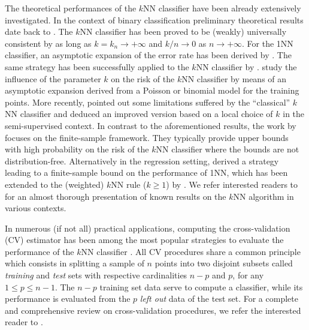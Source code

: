 \documentclass[twoside,11pt]{article}
\numberwithin{equation}{section}
\newcommand{\1}{\mathds{1}}%
\numberwithin{equation}{section}
\theoremstyle{plain}
\begin{document}
The theoretical performances of the $k$NN classifier have been already extensively investigated.
%
In the context of binary classification preliminary theoretical results date back to \cite{Cover_Hart:1967,Cover68,Gyorfi_1981}.
	The $k$NN classifier has been proved to be (weakly) universally consistent by \citet{Stone_1977} as long as $k=k_n \to +\infty$ and $k/n \to 0$ as $n\to +\infty$.
	For the 1NN classifier, an asymptotic expansion of the error rate has been derived by \citet{Psaltis_Snapp_Venkatesh:1994}. The same strategy has been successfully applied to the $k$NN classifier by \cite{Snapp_Venkatesh:1998}.
%
\cite{Hall_Park_Samworth:2008} study the influence of the parameter $k$ on the risk of the $k$NN classifier by means of an asymptotic expansion derived from a Poisson or binomial model for the training points.
%
 {More recently, \citet{CanniBerrettSamwo_2017} pointed out some limitations suffered by the ``classical'' $k$NN classifier and deduced an improved version based on a local choice of $k$ in the semi-supervised context.}
%
In contrast to the aforementioned results, the work by \cite{Chaudhuri_Dasgupta2014} focuses on the finite-sample framework. They typically provide upper bounds with high probability on the risk of the $k$NN classifier where the bounds are not distribution-free.
%
Alternatively in the regression setting, \cite{KulkPosner:1995} derived a strategy leading to a finite-sample bound on the performance of 1NN, which has been extended to the (weighted) $k$NN rule ($k\geq 1$) by \citet{Biau_Cerou_Guyader:2010,Biau_Cerou_Guyader:2010_function}  {\citep[see also][where a weighted $k$NN estimator is designed for estimating the entropy]{BerrSamwYuan_2016}}.
%
We refer interested readers to \cite{BiauDevroye_2016} for an almost thorough presentation of known results on the $k$NN algorithm in various contexts.
%


\medskip

In numerous (if not all) practical applications, computing the cross-validation (CV) estimator \citep{Ston74,Sto:1982} has been among the most popular strategies to evaluate the performance of the $k$NN classifier \citep[][Section~24.3]{DeGyLu_1996}.
%
%
All CV procedures share a common principle which consists in splitting a sample of $n$ points into two disjoint subsets called \emph{training} and \emph{test} sets with respective cardinalities $n-p$ and $p$, for any $1\leq p \leq n-1$. The $n-p$ training set data serve to compute a classifier, while its performance is evaluated from the $p$ \emph{left out} data of the test set.
%
For a complete and comprehensive review on cross-validation procedures, we refer the interested reader to \cite{ArCe_2010_survey}.
%
\end{document}
